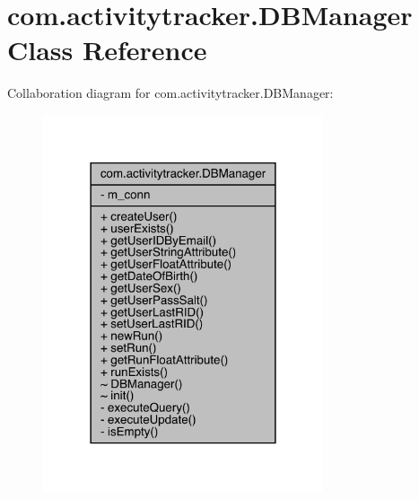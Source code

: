 \hypertarget{classcom_1_1activitytracker_1_1_d_b_manager}{}\section{com.\+activitytracker.\+D\+B\+Manager Class Reference}
\label{classcom_1_1activitytracker_1_1_d_b_manager}


Collaboration diagram for com.\+activitytracker.\+D\+B\+Manager\+:
\nopagebreak
\begin{figure}[H]
\begin{center}
\leavevmode
\includegraphics[width=234pt]{classcom_1_1activitytracker_1_1_d_b_manager__coll__graph}
\end{center}
\end{figure}

